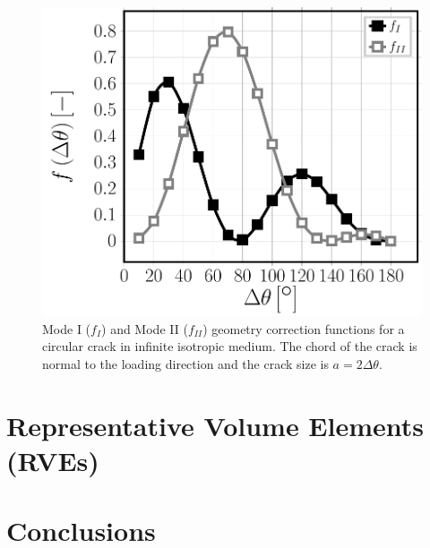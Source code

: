 \documentclass[a4paper,fleqn]{cas-dc}
\begin{document}
\begin{figure}
\includegraphics[width=\columnwidth]{curvedcracks.pdf}
\caption{Mode I ($f_{I}$) and Mode II ($f_{II}$) geometry correction functions for a circular crack in infinite isotropic medium. The chord of the crack is normal to the loading direction and the crack size is $a=2\Delta\theta$.}\label{fig:curvedcrackgeomcorr}
\end{figure}

\section{Representative Volume Elements (RVEs)}










\section{Conclusions}




%




\end{document}
